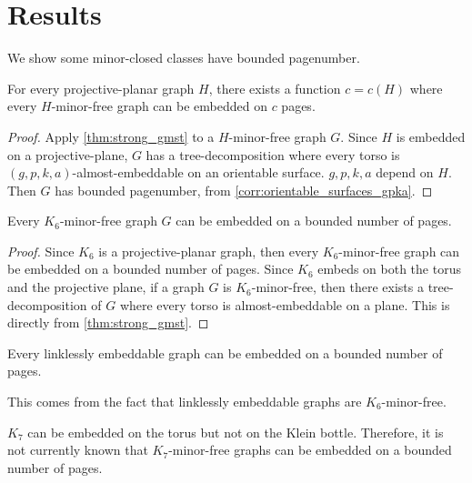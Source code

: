 \section{Results}
We show some minor-closed classes have bounded pagenumber.

\begin{proposition}
	For every projective-planar graph $H$, there exists a function $c = c(H)$ where every $H$-minor-free graph can be embedded on $c$ pages. 
\end{proposition}
\begin{proof}
	Apply \cref{thm:strong_gmst} to a $H$-minor-free graph $G$. Since $H$ is embedded on a projective-plane, $G$ has a tree-decomposition where every torso is $(g,p,k,a)$-almost-embeddable on an orientable surface. $g, p, k,a$ depend on $H$. Then $G$ has bounded pagenumber, from \cref{corr:orientable_surfaces_gpka}.
\end{proof}

\begin{corollary}\label{corr:k6_minor_pn}
	Every $K_6$-minor-free graph $G$ can be embedded on a bounded number of pages.
\end{corollary}

\begin{proof}
	Since $K_6$ is a projective-planar graph, then every $K_6$-minor-free graph can be embedded on a bounded number of pages. Since $K_6$ embeds on both the torus and the projective plane, if a graph $G$ is $K_6$-minor-free, then there exists a tree-decomposition of $G$ where every torso is almost-embeddable on a plane. This is directly from \cref{thm:strong_gmst}. 
\end{proof}
\begin{corollary}
    Every linklessly embeddable graph can be embedded on a bounded number of pages.
\end{corollary}
This comes from the fact that linklessly embeddable graphs are $K_6$-minor-free.

$K_7$ can be embedded on the torus but not on the Klein bottle. Therefore, it is not currently known that $K_7$-minor-free graphs can be embedded on a bounded number of pages. 


